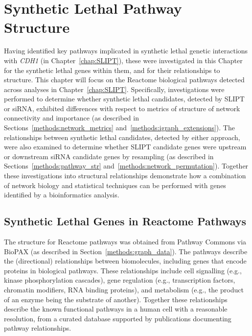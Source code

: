 \chapter{Synthetic Lethal Pathway Structure}
\label{chap:Pathways}
  
Having identified key \glspl{pathway} implicated in \gls{synthetic lethal} genetic interactions with \textit{CDH1} (in Chapter~\ref{chap:SLIPT}), these were investigated in this Chapter for the \gls{synthetic lethal} genes within them, and for their relationships to  structure. This chapter will focus on the Reactome biological \glspl{pathway} detected across analyses in Chapter~\ref{chap:SLIPT}. 
%
Specifically, investigations were performed to determine whether \gls{synthetic lethal} candidates, detected by \gls{SLIPT} or \gls{siRNA}, exhibited differences with respect to metrics of  structure of network connectivity and importance (as described in Sections~\ref{methods:network_metrics} and~\ref{methods:igraph_extensions}). The relationships between \gls{synthetic lethal} candidates, detected by either approach, were also examined to determine whether \gls{SLIPT} candidate genes were upstream or downstream \gls{siRNA} candidate genes %
by resampling (as described in Sections~\ref{methods:pathway_str} and~\ref{methods:network_permutation}). %
%
Together these investigations into structural relationships demonstrate how a combination of network biology and statistical techniques can be performed with genes identified by a \gls{bioinformatics} analysis.

\FloatBarrier

\section{Synthetic Lethal Genes in Reactome Pathways} \label{chapt4:SL_Genes}

\FloatBarrier

The  structure for Reactome \glspl{pathway} was obtained from Pathway Commons via \gls{BioPAX} (as described in Section~\ref{methods:graph_data}). The \glspl{pathway} describe the (directional) relationships between biomolecules, including genes that encode proteins in biological \glspl{pathway}. These relationships include cell signalling (e.g., kinase phosphorylation cascades), gene regulation (e.g., transcription factors, chromatin modifiers, \acrshort{RNA} binding proteins), and metabolism (e.g., the product of an enzyme being the substrate of another). Together these relationships describe the known functional \glspl{pathway} in a human cell with a reasonable resolution, from a curated database supported by publications documenting \gls{pathway} relationships. 

